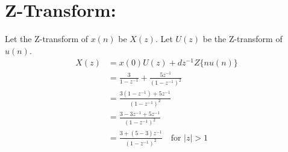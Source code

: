 \documentclass[12pt]{article}
\newcommand{\initialterm}{3}
\newcommand{\commondifference}{5}
\begin{document}
\section{Z-Transform:}
Let the Z-transform of \(x(n)\) be \(X(z)\). Let \(U(z)\) be the Z-transform of \(u(n)\).
\begin{align}
X(z) &= x(0)U(z) + dz^{-1}Z\{nu(n)\} \\
&= \frac{\initialterm}{1 - z^{-1}} + \frac{\commondifference z^{-1}}{(1 - z^{-1})^2} \\
&= \frac{\initialterm(1 - z^{-1}) + \commondifference z^{-1}}{(1 - z^{-1})^2} \\
&= \frac{\initialterm - \initialterm z^{-1} + \commondifference z^{-1}}{(1 - z^{-1})^2} \\
&= \frac{\initialterm + (\commondifference - \initialterm)z^{-1}}{(1 - z^{-1})^2} \quad \text{for } |z| > 1
\end{align}
\end{document}
